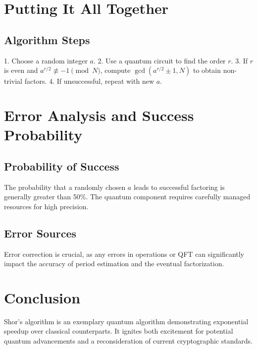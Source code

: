 \documentclass{article}
\begin{document}
\section{Putting It All Together}

\subsection{Algorithm Steps}
1. Choose a random integer \( a \).
2. Use a quantum circuit to find the order \( r \).
3. If \( r \) is even and \( a^{r/2} \not\equiv -1 \pmod{N} \), compute \( \gcd(a^{r/2} \pm 1, N) \) to obtain non-trivial factors.
4. If unsuccessful, repeat with new \( a \).

\section{Error Analysis and Success Probability}

\subsection{Probability of Success}
The probability that a randomly chosen \( a \) leads to successful factoring is generally greater than 50\%. The quantum component requires carefully managed resources for high precision.

\subsection{Error Sources}
Error correction is crucial, as any errors in operations or QFT can significantly impact the accuracy of period estimation and the eventual factorization.

\section{Conclusion}

Shor's algorithm is an exemplary quantum algorithm demonstrating exponential speedup over classical counterparts. It ignites both excitement for potential quantum advancements and a reconsideration of current cryptographic standards.
\end{document}

